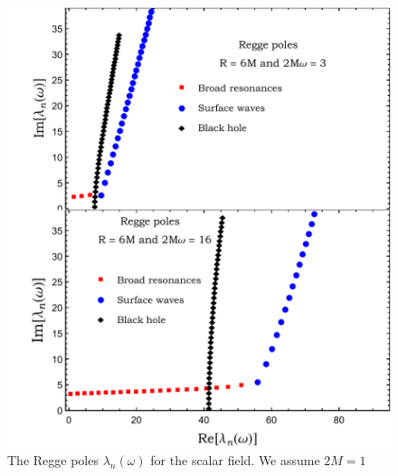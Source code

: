 \documentclass[aps,prd,longbibliography,reprint,twocolumn,amsmath,amssymb,amsfonts,showpacs,superscriptaddress]{revtex4-1}%
\begin{document}
 \begin{figure}[htb]
\centering
 \includegraphics[scale=0.50]{RP_R_6_2Mw_3_16}
\caption{\label{RP_approx_2Mw_3_6_s_1} The Regge poles $\lambda_n(\omega)$ for the scalar field. We assume $2M =1$}
\end{figure}
\end{document}
